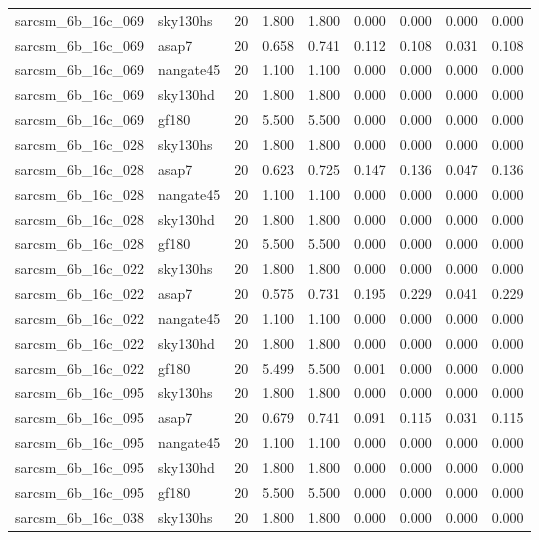 \begin{tabular}{llrrrrrrr}
sarcsm\_6b\_16c\_069 & sky130hs & 20 & 1.800 & 1.800 & 0.000 & 0.000 & 0.000 & 0.000 \\
sarcsm\_6b\_16c\_069 & asap7 & 20 & 0.658 & 0.741 & 0.112 & 0.108 & 0.031 & 0.108 \\
sarcsm\_6b\_16c\_069 & nangate45 & 20 & 1.100 & 1.100 & 0.000 & 0.000 & 0.000 & 0.000 \\
sarcsm\_6b\_16c\_069 & sky130hd & 20 & 1.800 & 1.800 & 0.000 & 0.000 & 0.000 & 0.000 \\
sarcsm\_6b\_16c\_069 & gf180 & 20 & 5.500 & 5.500 & 0.000 & 0.000 & 0.000 & 0.000 \\
sarcsm\_6b\_16c\_028 & sky130hs & 20 & 1.800 & 1.800 & 0.000 & 0.000 & 0.000 & 0.000 \\
sarcsm\_6b\_16c\_028 & asap7 & 20 & 0.623 & 0.725 & 0.147 & 0.136 & 0.047 & 0.136 \\
sarcsm\_6b\_16c\_028 & nangate45 & 20 & 1.100 & 1.100 & 0.000 & 0.000 & 0.000 & 0.000 \\
sarcsm\_6b\_16c\_028 & sky130hd & 20 & 1.800 & 1.800 & 0.000 & 0.000 & 0.000 & 0.000 \\
sarcsm\_6b\_16c\_028 & gf180 & 20 & 5.500 & 5.500 & 0.000 & 0.000 & 0.000 & 0.000 \\
sarcsm\_6b\_16c\_022 & sky130hs & 20 & 1.800 & 1.800 & 0.000 & 0.000 & 0.000 & 0.000 \\
sarcsm\_6b\_16c\_022 & asap7 & 20 & 0.575 & 0.731 & 0.195 & 0.229 & 0.041 & 0.229 \\
sarcsm\_6b\_16c\_022 & nangate45 & 20 & 1.100 & 1.100 & 0.000 & 0.000 & 0.000 & 0.000 \\
sarcsm\_6b\_16c\_022 & sky130hd & 20 & 1.800 & 1.800 & 0.000 & 0.000 & 0.000 & 0.000 \\
sarcsm\_6b\_16c\_022 & gf180 & 20 & 5.499 & 5.500 & 0.001 & 0.000 & 0.000 & 0.000 \\
sarcsm\_6b\_16c\_095 & sky130hs & 20 & 1.800 & 1.800 & 0.000 & 0.000 & 0.000 & 0.000 \\
sarcsm\_6b\_16c\_095 & asap7 & 20 & 0.679 & 0.741 & 0.091 & 0.115 & 0.031 & 0.115 \\
sarcsm\_6b\_16c\_095 & nangate45 & 20 & 1.100 & 1.100 & 0.000 & 0.000 & 0.000 & 0.000 \\
sarcsm\_6b\_16c\_095 & sky130hd & 20 & 1.800 & 1.800 & 0.000 & 0.000 & 0.000 & 0.000 \\
sarcsm\_6b\_16c\_095 & gf180 & 20 & 5.500 & 5.500 & 0.000 & 0.000 & 0.000 & 0.000 \\
sarcsm\_6b\_16c\_038 & sky130hs & 20 & 1.800 & 1.800 & 0.000 & 0.000 & 0.000 & 0.000 \\

\end{tabular}
